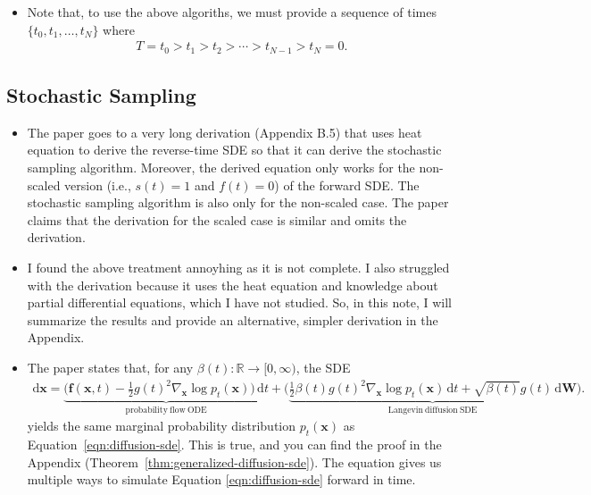 \documentclass[10pt]{article}
\newcommand{\dee}{\mathrm{d}}
\newcommand{\ve}[1]{\mathbf{#1}}
\newcommand{\Real}{\mathbb{R}}
\begin{document}
\begin{itemize}
  \item Note that, to use the above algoriths, we must provide a sequence of times $\{ t_0, t_1, \dotsc, t_N \}$ where
  \begin{align*}
    T = t_0 > t_1 > t_2 > \dotsb > t_{N-1} > t_N = 0.
  \end{align*}
\end{itemize}

\subsection{Stochastic Sampling}

\begin{itemize}
  \item The paper goes to a very long derivation (Appendix B.5) that uses heat equation to derive the reverse-time SDE \cite{Anderson:1982} so that it can derive the stochastic sampling algorithm. Moreover, the derived equation only works for the non-scaled version (i.e., $s(t) = 1$ and $f(t) = 0$) of the forward SDE. The stochastic sampling algorithm is also only for the non-scaled case. The paper claims that the derivation for the scaled case is similar and omits the derivation.
  
  \item I found the above treatment annoyhing as it is not complete. I also struggled with the derivation because it uses the heat equation and knowledge about partial differential equations, which I have not studied. So, in this note, I will summarize the results and provide an alternative, simpler derivation in the Appendix.  

  \item The paper states that, for any $\beta(t): \Real \rightarrow [0,\infty)$, the SDE
  \begin{align}
    \dee\ve{x} = \underbrace{\bigg( \ve{f}(\ve{x},t) - \frac{1}{2}g(t)^2 \nabla_{\ve{x}} \log p_t(\ve{x}) \bigg)\, \dee t}_{\mathrm{probability\ flow\ ODE}} +  \bigg( \underbrace{\frac{1}{2} \beta(t) g(t)^2 \nabla_{\ve{x}} \log p_t(\ve{x})\, \dee t + \sqrt{\beta(t)} g(t)\, \dee \ve{W}}_{\mathrm{Langevin\ diffusion\ SDE}} \bigg). \label{eqn:generalized-diffusion-sde}
  \end{align}
  yields the same marginal probability distribution $p_t(\ve{x})$ as Equation~\ref{eqn:diffusion-sde}. This is true, and you can find the proof in the Appendix (Theorem~\ref{thm:generalized-diffusion-sde}). The equation gives us multiple ways to simulate Equation \eqref{eqn:diffusion-sde} forward in time.
  

\end{itemize}
\end{document}
